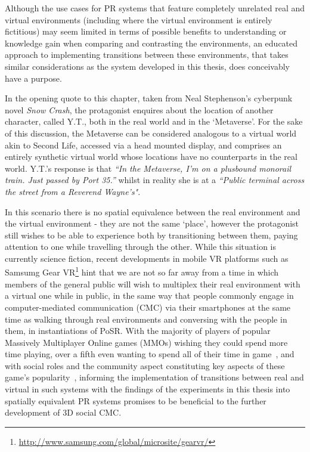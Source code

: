 Although the use cases for PR systems that feature completely unrelated real and virtual environments (including where the virtual environment is entirely fictitious) may seem limited in terms of possible benefits to understanding or knowledge gain when comparing and contrasting the environments, an educated approach to implementing transitions between these environments, that takes similar considerations as the system developed in this thesis, does conceivably have a purpose.

In the opening quote to this chapter, taken from Neal Stephenson's cyberpunk novel \textit{Snow Crash}, the protagonist enquires about the location of another character, called Y.T., both in the real world and in the `Metaverse'. For the sake of this discussion, the Metaverse can be considered analogous to a virtual world akin to Second Life, accessed via a head mounted display, and comprises an entirely synthetic virtual world whose locations have no counterparts in the real world. Y.T.'s response is that \textit{``In  the Metaverse, I'm on a plusbound monorail train. Just passed by Port 35.''} whilst in reality she is at a \textit{``Public terminal across the street from a Reverend Wayne's"}.

In this scenario there is no spatial equivalence between the real environment and the virtual environment - they are not the same `place', however the protagonist still wishes to be able to experience both by transitioning between them, paying attention to one while travelling through the other. While this situation is currently science fiction, recent developments in mobile VR platforms such as Samsumg Gear VR\footnote{\url{http://www.samsung.com/global/microsite/gearvr/}} hint that we are not so far away from a time in which members of the general public will wish to multiplex their real environment with a virtual one while in public, in the same way that people commonly engage in computer-mediated communication (CMC) via their smartphones at the same time as walking through real environments and conversing with the people in them, in instantiations of PoSR. With the majority of players of popular Massively Multiplayer Online games (MMOs) wishing they could spend more time playing, over a fifth even wanting to spend all of their time in game~\cite{Castronova2006}, and with social roles and the community aspect constituting key aspects of these game's popularity~\cite{Castronova2006, Bartle2004}, informing the implementation of transitions between real and virtual in such systems with the findings of the experiments in this thesis into spatially equivalent PR systems promises to be beneficial to the further development of 3D social CMC.

